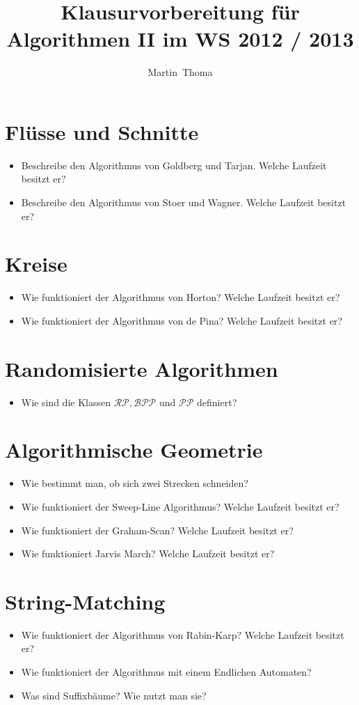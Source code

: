 \documentclass[a4paper,12pt]{article}
\newcommand{\Nachname}{Thoma}
\newcommand{\Vorname}{Martin}
\newcommand{\Titel}{Klausurvorbereitung für Algorithmen II im WS 2012 / 2013}
\begin{document}
\title{\Titel}
\author{\Vorname~\Nachname}

\section{Flüsse und Schnitte}
\begin{itemize}
    \item Beschreibe den Algorithmus von Goldberg und Tarjan. Welche Laufzeit besitzt er?
    \item Beschreibe den Algorithmus von Stoer und Wagner. Welche Laufzeit besitzt er?
\end{itemize}

\section{Kreise}
\begin{itemize}
    \item Wie funktioniert der Algorithmus von Horton?  Welche Laufzeit besitzt er?
    \item Wie funktioniert der Algorithmus von de Pina? Welche Laufzeit besitzt er?
\end{itemize}

\section{Randomisierte Algorithmen}
\begin{itemize}
    \item Wie sind die Klassen $\mathcal{RP}, \mathcal{BPP}$ und
          $\mathcal{PP}$ definiert?
\end{itemize}

\section{Algorithmische Geometrie}
\begin{itemize}
    \item Wie bestimmt man, ob sich zwei Strecken schneiden?
    \item Wie funktioniert der Sweep-Line Algorithmus? Welche Laufzeit besitzt er?
    \item Wie funktioniert der Graham-Scan? Welche Laufzeit besitzt er?
    \item Wie funktioniert Jarvis March? Welche Laufzeit besitzt er?
\end{itemize}

\section{String-Matching}
\begin{itemize}
    \item Wie funktioniert der Algorithmus von Rabin-Karp? Welche Laufzeit besitzt er?
    \item Wie funktioniert der Algorithmus mit einem Endlichen Automaten?
    \item Was sind Suffixbäume? Wie nutzt man sie?
\end{itemize}
\end{document}
